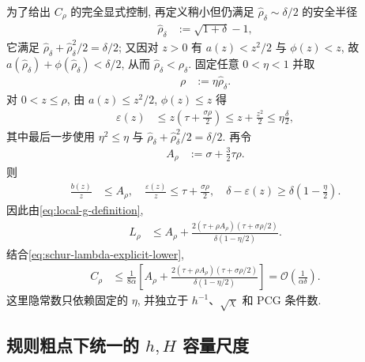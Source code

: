 \documentclass{ctexart}
\newcommand{\q}{\quad}
\renewcommand{\O}{\mathcal{O}}
\newcommand{\dt}{\delta}
\renewcommand{\ge}{\geqslant}
\renewcommand{\le}{\leqslant}
\begin{document}
为了给出 $C_\rho$ 的完全显式控制, 再定义稍小但仍满足
$\widehat\rho_\dt\sim\dt/2$ 的安全半径
\begin{align}
    \widehat\rho_\dt&:=\sqrt{1+\dt}-1,
    \label{eq:safe-local-radius}
\end{align}
它满足
$\widehat\rho_\dt+\widehat\rho_\dt^2/2=\dt/2$; 又因对 $z>0$ 有 $a(z)<z^2/2$ 与 $\phi(z)<z$, 故 $a(\widehat\rho_\dt)+\phi(\widehat\rho_\dt)<\dt/2$, 从而
$\widehat\rho_\dt<\rho_\dt$. 固定任意 $0<\eta<1$ 并取
\begin{align}
    \rho&:=\eta\widehat\rho_\dt.
    \label{eq:fixed-fraction-local-radius}
\end{align}
对 $0<z\le\rho$, 由
$a(z)\le z^2/2$, $\phi(z)\le z$ 得
\begin{align}
    \varepsilon(z)
    &\le z\left(\tau+\frac{\sigma\rho}{2}\right)
     \le z+\frac{z^2}{2}
     \le\eta\frac\dt2,
    \label{eq:epsilon-fixed-fraction-bound}
\end{align}
其中最后一步使用
$\eta^2\le\eta$ 与
$\widehat\rho_\dt+\widehat\rho_\dt^2/2=\dt/2$.
再令
\begin{align}
    A_\rho&:=\sigma+\frac32\tau\rho.
    \label{eq:Arho-definition}
\end{align}
则
\begin{align}
    \frac{b(z)}{z}&\le A_\rho,\q
    \frac{\varepsilon(z)}{z}\le\tau+\frac{\sigma\rho}{2},\q
    \dt-\varepsilon(z)\ge\dt\left(1-\frac\eta2\right).
    \label{eq:g-components-fixed-fraction}
\end{align}
因此由\cref{eq:local-g-definition},
\begin{align}
    L_\rho
    &\le A_\rho
      +\frac{
        2(\tau+\rho A_\rho)
        (\tau+\sigma\rho/2)
      }{
        \dt(1-\eta/2)
      }.
    \label{eq:Lrho-explicit-upper}
\end{align}
结合\cref{eq:schur-lambda-explicit-lower},
\begin{align}
    C_\rho
    &\le\frac1{8\alpha}\left[
      A_\rho
      +\frac{
        2(\tau+\rho A_\rho)
        (\tau+\sigma\rho/2)
      }{
        \dt(1-\eta/2)
      }
    \right]
     =\O\left(\frac1{\alpha\dt}\right).
    \label{eq:sharp-C-scaling}
\end{align}
这里隐常数只依赖固定的 $\eta$, 并独立于 $h^{-1}$、$\sqrt\chi$ 和 PCG 条件数.


\subsection{规则粗点下统一的 \texorpdfstring{$h,H$}{h,H} 容量尺度}
\label{subsec:structured-kappa}
\end{document}
